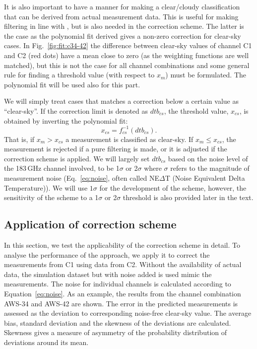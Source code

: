 \documentclass[12pt]{article}
\begin{document}
It is also important to have a manner for making a clear/cloudy classification
that can be derived from actual measurement data. This is useful for making
filtering in line with \citet{rekha2012potential}, but is also needed in the
correction scheme. The latter is the case as the polynomial fit derived gives a
non-zero correction for clear-sky cases. In Fig.~\ref{fig:fit:c34-42} the
difference between clear-sky values of channel C1 and C2 (red dots) have a mean
close to zero (as the weighting functions are well matched), but this is not
the case for all channel combinations and some general rule for finding a
threshold value (with respect to $x_m$) must be formulated. The polynomial fit
will be used also for this part.

We will simply treat cases that matches a correction below a certain value as
``clear-sky''. If the correction limit is denoted as $dtb_{cs}$, the threshold
value, $x_{cs}$, is obtained by inverting the polynomial fit:
\begin{equation}
x_{cs} = f_{cs}^{-1}(dtb_{cs}).
\label{eq:dtb}
\end{equation}
That is, if $x_m>x_{cs}$ a measurement is classified as clear-sky. If
$x_m\leq x_{cs}$, the measurement is rejected if a pure filtering is made, or
it is adjusted if the correction scheme is applied. We will largely set
$dtb_{cs}$ based on the noise level of the 183\,GHz channel involved, to be
1$\sigma$ or 2$\sigma$ where $\sigma$ refers to the magnitude of measurement
noise (Eq.~\ref{eq:noise}, often called NE$\Delta$T (Noise Equivalent Delta Temperature)). We will use $1\sigma$ for
the development of the scheme, however, the sensitivity of the scheme to
a 1$\sigma$ or 2$\sigma$ threshold is also provided later in the text.



\subsection{Application of correction scheme}
%
In this section, we test the applicability of the correction scheme in detail.
To analyse the performance of the approach, we apply it to correct the
measurements from C1 using data from C2. Without the availability of actual
data, the simulation dataset but with noise added is used mimic the
measurements. The noise for individual channels is calculated according to
Equation~\ref{eq:noise}. As an example, the results from the channel
combination AWS-34 and AWS-42 are shown. The error in the predicted
measurements is assessed as the deviation to corresponding noise-free clear-sky
value. The average bias, standard deviation and the skewness of the
deviations are calculated. Skewness gives a measure of asymmetry of the
probability distribution of deviations around its mean.
\end{document}
